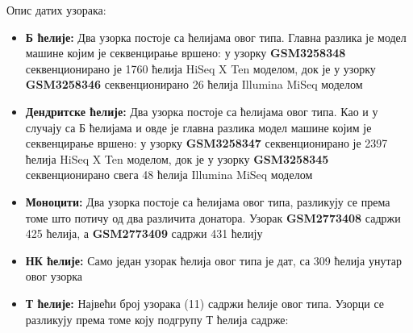 \documentclass[10pt, a4paper]{article}
\begin{document}
Опис датих узорака:
\begin{itemize}
\item\textbf{Б ћелије: }Два узорка постоје са ћелијама овог типа. Главна разлика је модел машине којим је секвенцирање вршено: у узорку \textbf{GSM3258348} секвенционирано је 1760 ћелија HiSeq X Ten моделом, док је у узорку \textbf{GSM3258346} секвенционирано 26 ћелија Illumina MiSeq моделом
\item\textbf{Дендритске ћелије:} Два узорка постоје са ћелијама овог типа. Као и у случају са Б ћелијама и овде је главна разлика модел машине којим је секвенцирање вршено: у узорку \textbf{GSM3258347} секвенционирано је 2397 ћелија HiSeq X Ten моделом, док је у узорку \textbf{GSM3258345} секвенционирано свега 48 ћелија Illumina MiSeq моделом
\item\textbf{Моноцити: }Два узорка постоје са ћелијама овог типа, разликују се према томе што потичу од два различита донатора. Узорак \textbf{GSM2773408} садржи 425 ћелија, а \textbf{GSM2773409} садржи 431 ћелију
\item\textbf{НК ћелије: }Само један узорак ћелија овог типа је дат, са 309 ћелија унутар овог узорка
\item\textbf{Т ћелије: }Највећи број узорака (11) садржи ћелије овог типа. Узорци се разликују према томе коју подгрупу Т ћелија садрже:


\end{itemize}
\end{document}
